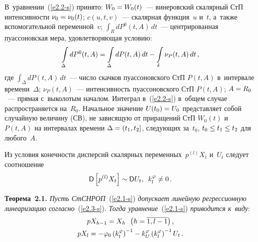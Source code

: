 \begin{multicols}{2}
В~уравнении~(\ref{e2.2-s}) принято: $W_0 \hm= W_0(t)$~--- винеровский скалярный СтП интенсивности $\nu_0 \hm=\nu_0(t)$; $c(u,t,v)$~--- 
скалярная функция~$u$ и~$t$, а~также вспомогательной переменной~$v$; $\int\nolimits_R dP^0 (t,A) \,dt$~--- 
цент\-ри\-ро\-ван\-ная пуассоновская мера, удовлетворяющая условию:
    $$
    \int\limits_\Delta dP^0 (t,A)= \int\limits_\Delta dP(t,A) \,dt- \int\limits_\delta \nu_P (t,A) \,dt\,,
    $$
где $\int\nolimits_\Delta dP(t,A) \,dt$~--- число скачков пуассоновского СтП $P(t,A)$ в~интервале времени~$\Delta$; $\nu_P(t,A)$~--- 
интенсивность пуассоновского СтП $P(t,A)$; $A\hm=R_0$~--- 
прямая с~выколотым началом. Интеграл в~(\ref{e2.2-s}) в~общем случае распространяется на~$R_0$. Начальное значение $U(t_0) \hm= U_0$ 
пред\-став\-ля\-ет собой случайную величину (СВ), не зависящую от приращений СтП  $W_0(t)$ и~$P(t,A)$ на интервалах времени  $\Delta \hm= (t_1, t_2]$, 
сле\-ду\-ющих за~$t_0$, $t_0\hm\le t_1\hm\le t_2$ для любого~$A$.

Из условия конечности дисперсий скалярных переменных~$p^{(l)} X_t$ и~$U_t$ следует соотношение
  \begin{equation*}
  {\sf D}\left[ p^{(l)} X_t\right] \sim {\sf D}U_t,\enskip k_l^\varphi \ne 0\,.
  \end{equation*}
  
  \noindent
  \textbf{Теорема~2.1.} \textit{Пусть СтСНРОП}~(\ref{e2.1-s}) 
  \textit{допускает линейную регрессионную линеаризацию согласно}~(\ref{e2.3-s}). \textit{Тогда уравнение}~(\ref{e2.1-s}) 
  \textit{приводится к~виду}:
   \begin{multline*}
   pX_{h-1} = X_h \enskip \left(h=\overline{1,l-1}\right),\\
   pX_l =-\varphi_0 \left(k_l^\varphi\right)^{-1} - k_U^\varphi 
   \left(k_l^\varphi\right)^{-1} U_t\,.
   \end{multline*}



\end{multicols}
